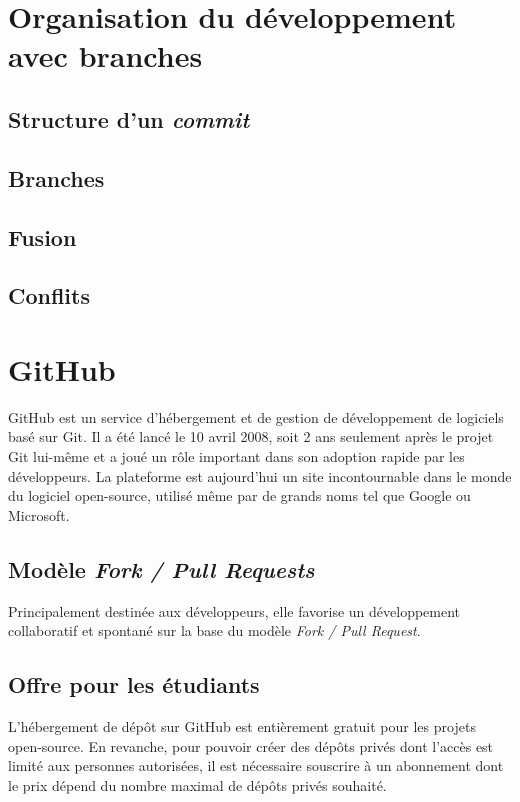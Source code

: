 \documentclass[11pt,a4paper]{article}
\begin{document}
\section{Organisation du développement avec branches}

\subsection{Structure d'un \textit{commit}}

\subsection{Branches}

\subsection{Fusion}

\subsection{Conflits}

\section{GitHub}

GitHub est un service d'hébergement et de gestion de développement de logiciels basé sur Git.
Il a été lancé le 10 avril 2008, soit 2 ans seulement après le projet Git lui-même et a joué un rôle important dans son adoption rapide par les développeurs.
La plateforme est aujourd'hui un site incontournable dans le monde du logiciel open-source, utilisé même par de grands noms tel que Google ou Microsoft. 

\subsection{Modèle \textit{Fork / Pull Requests}}

Principalement destinée aux développeurs, elle favorise un développement collaboratif et spontané sur la base du modèle {\it Fork / Pull Request}.

\subsection{Offre pour les étudiants}

L'hébergement de dépôt sur GitHub est entièrement gratuit pour les projets open-source.
En revanche, pour pouvoir créer des dépôts privés dont l'accès est limité aux personnes autorisées, il est nécessaire souscrire à un abonnement dont le prix dépend du nombre maximal de dépôts privés souhaité.
\end{document}
